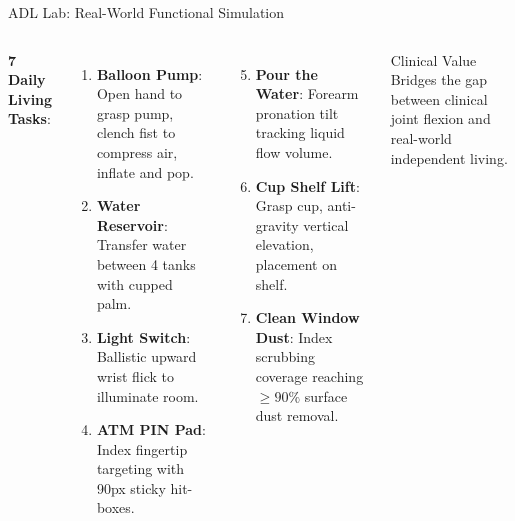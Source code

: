 \documentclass{beamer}
\begin{document}
\begin{frame}{ADL Lab: Real-World Functional Simulation}
\begin{columns}
\textbf{7 Daily Living Tasks}:
\begin{enumerate}
    \item \textbf{Balloon Pump}: Open hand to grasp pump, clench fist to compress air, inflate and pop.
    \item \textbf{Water Reservoir}: Transfer water between 4 tanks with cupped palm.
    \item \textbf{Light Switch}: Ballistic upward wrist flick to illuminate room.
    \item \textbf{ATM PIN Pad}: Index fingertip targeting with 90px sticky hit-boxes.
\end{enumerate}

\begin{enumerate}
    \setcounter{enumi}{4}
    \item \textbf{Pour the Water}: Forearm pronation tilt tracking liquid flow volume.
    \item \textbf{Cup Shelf Lift}: Grasp cup, anti-gravity vertical elevation, placement on shelf.
    \item \textbf{Clean Window Dust}: Index scrubbing coverage reaching $\ge 90\%$ surface dust removal.
\end{enumerate}

\begin{block}{Clinical Value}
Bridges the gap between clinical joint flexion and real-world independent living.
\end{block}
\end{columns}
\end{frame}
\end{document}
